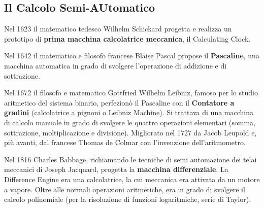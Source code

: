 \documentclass[12pt]{article}
\begin{document}
\subsection{Il Calcolo Semi-AUtomatico}
Nel 1623 il matematico tedesco Wilhelm Schickard progetta e realizza un prototipo di \textbf{prima macchina calcolatrice meccanica}, il Calculating Clock.\par\medskip\noindent 
Nel 1642 il matematico e filosofo francese Blaise Pascal propose il \textbf{Pascaline}, una macchina automatica in grado di svolgere l’operazione di addizione e di sottrazione. 
\par\medskip\noindent
Nel 1672 il filosofo e matematico Gottfried Wilhelm Leibniz, famoso per lo studio aritmetico del sistema binario, perfezionò il Pascaline con il \textbf{Contatore a gradini} (calcolatrice a pignoni o Leibniz Machine). Si trattava di una macchina di calcolo manuale in grado di svolgere le quattro operazioni elementari (somma, sottrazione, moltiplicazione e divisione). Migliorato nel 1727 da Jacob Leupold e, più avanti, dal francese Thomas de Colmar con l’invenzione dell’aritmometro.
\par\medskip\noindent
Nel 1816 Charles Babbage, richiamando le tecniche di semi automazione dei telai meccanici di Joseph Jacquard, progetta la\textbf{ macchina differenziale}. La Difference Engine era una calcolatrice, la cui meccanica era attivata da un motore a vapore. Oltre alle normali operazioni aritmetiche, era in grado di svolgere il calcolo polinomiale (per la risoluzione di funzioni logaritmiche, serie di Taylor).
\end{document}
